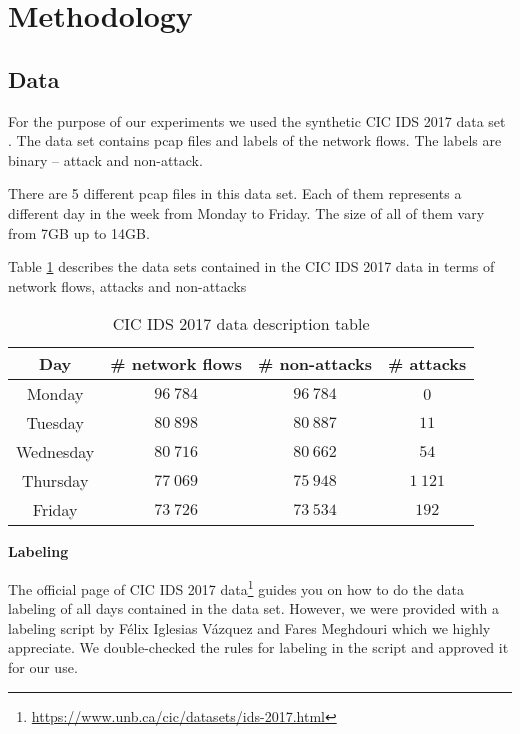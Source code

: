 \documentclass{article}
\begin{document}
\section{Methodology}
\subsection{Data}\label{sec-data-cic-ids-2017}
For the purpose of our experiments we used the synthetic CIC IDS 2017 data set \cite{sharafaldin2018toward}. The data set contains pcap files and labels of the network flows. The labels are binary -- attack and non-attack.

There are 5 different pcap files in this data set. Each of them represents a different day in the week from Monday to Friday. The size of all of them vary from 7GB up to 14GB.

Table \ref{tab:cic-ids2017-data-description} describes the data sets contained in the CIC IDS 2017 data in terms of network flows, attacks and non-attacks

\begin{table}[h!]
\centering
    \begin{tabular}{ |c|c|c|c| }
        \hline
        Day & \# network flows & \# non-attacks & \# attacks \\
        \hline
        Monday & $96\ 784$ & $96\ 784$ & 0 \\
        Tuesday & $80\ 898$ & $80\ 887$ & $11$ \\
        Wednesday & $80\ 716$ & $80\ 662$ & $54$ \\
        Thursday & $77\ 069$ & $75\ 948$ & $1\ 121$ \\
        Friday & $73\ 726$ & $73\ 534$ & $192$ \\
        \hline
    \end{tabular}
\caption{CIC IDS 2017 data description table}
\label{tab:cic-ids2017-data-description}
\end{table}


\noindent\textbf{Labeling}

The official page of CIC IDS 2017 data\footnote{\url{https://www.unb.ca/cic/datasets/ids-2017.html}} guides you on how to do the data labeling of all days contained in the data set. However, we were provided with a labeling script by Félix Iglesias Vázquez and Fares Meghdouri which we highly appreciate. We double-checked the rules for labeling in the script and approved it for our use.


\end{document}
